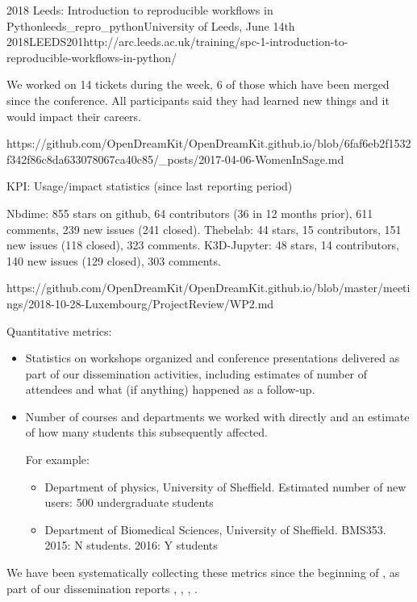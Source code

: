 \begin{Aim 1}
\begin{Aim 2}
\begin{event}{2018 Leeds: Introduction to reproducible workflows in Python}{leeds_repro_python}{University of Leeds, June 14th 2018}{LEEDS}{20}{1}{http://arc.leeds.ac.uk/training/spc-1-introduction-to-reproducible-workflows-in-python/}
\begin{itemize}
We worked on 14 tickets during the week, 6 of those which have been merged since the conference. All participants said they had learned new things and it would impact their careers.

https://github.com/OpenDreamKit/OpenDreamKit.github.io/blob/6faf6eb2f1532f342f86c8da633078067ca40c85/_posts/2017-04-06-WomenInSage.md



KPI: Usage/impact statistics (since last reporting period)

Nbdime: 855 stars on github, 64 contributors (36 in 12 months prior), 611 
comments, 239 new issues (241 closed).
Thebelab: 44 stars, 15 contributors, 151 new issues (118 closed), 323 
comments.
K3D-Jupyter: 48 stars, 14 contributors, 140 new issues (129 closed), 303 
comments.



https://github.com/OpenDreamKit/OpenDreamKit.github.io/blob/master/meetings/2018-10-28-Luxembourg/ProjectReview/WP2.md


Quantitative metrics:
\begin{itemize}
\item Statistics on workshops organized and conference presentations
  delivered as part of our dissemination activities, including
  estimates of number of attendees and what (if anything) happened as
  a follow-up.
\item Number of courses and departments we worked with directly and an
  estimate of how many students this subsequently affected.

  For example:
  \begin{itemize}
  \item Department of physics, University of Sheffield. Estimated
    number of new users: 500 undergraduate students
  \item Department of Biomedical Sciences, University of Sheffield.
    BMS353. 2015: N students. 2016: Y students
  \end{itemize}
\end{itemize}

We have been systematically collecting these metrics since the
beginning of \ODK, as part of our dissemination reports
, ,
, .




















\end{itemize}
\end{event}
\end{Aim 2}
\end{Aim 1}
